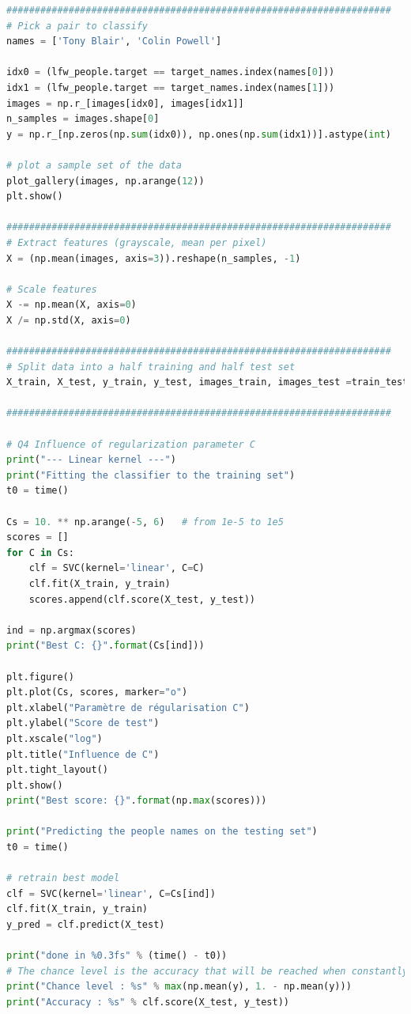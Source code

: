 \documentclass{book}
\begin{document}
\begin{lstlisting}[language=Python, caption=Code python complet]
####################################################################
# Pick a pair to classify
names = ['Tony Blair', 'Colin Powell']

idx0 = (lfw_people.target == target_names.index(names[0]))
idx1 = (lfw_people.target == target_names.index(names[1]))
images = np.r_[images[idx0], images[idx1]]
n_samples = images.shape[0]
y = np.r_[np.zeros(np.sum(idx0)), np.ones(np.sum(idx1))].astype(int)

# plot a sample set of the data
plot_gallery(images, np.arange(12))
plt.show()

####################################################################
# Extract features (grayscale, mean per pixel)
X = (np.mean(images, axis=3)).reshape(n_samples, -1)

# Scale features
X -= np.mean(X, axis=0)
X /= np.std(X, axis=0)

####################################################################
# Split data into a half training and half test set
X_train, X_test, y_train, y_test, images_train, images_test =train_test_split(X, y, images, test_size=0.5, random_state=0)

####################################################################

# Q4 Influence of regularization parameter C
print("--- Linear kernel ---")
print("Fitting the classifier to the training set")
t0 = time()

Cs = 10. ** np.arange(-5, 6)   # from 1e-5 to 1e5
scores = []
for C in Cs:
    clf = SVC(kernel='linear', C=C)
    clf.fit(X_train, y_train)
    scores.append(clf.score(X_test, y_test))

ind = np.argmax(scores)
print("Best C: {}".format(Cs[ind]))

plt.figure()
plt.plot(Cs, scores, marker="o")
plt.xlabel("Paramètre de régularisation C")
plt.ylabel("Score de test")
plt.xscale("log")
plt.title("Influence de C")
plt.tight_layout()
plt.show()
print("Best score: {}".format(np.max(scores)))

print("Predicting the people names on the testing set")
t0 = time()

# retrain best model
clf = SVC(kernel='linear', C=Cs[ind])
clf.fit(X_train, y_train)
y_pred = clf.predict(X_test)

print("done in %0.3fs" % (time() - t0))
# The chance level is the accuracy that will be reached when constantly predicting the majority class.
print("Chance level : %s" % max(np.mean(y), 1. - np.mean(y)))
print("Accuracy : %s" % clf.score(X_test, y_test))


\end{lstlisting}
\end{document}
